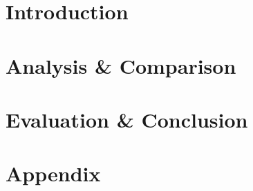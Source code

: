 \documentclass[openright,
               titlepage,
               numbers=noenddot,
               headinclude,
               footinclude=true,
               cleardoublepage=empty,
               abstractoff,
               BCOR=5mm,
               paper=a4,
               fontsize=11pt,
              ]{scrreprt}
\begin{document}
  \frenchspacing
  \raggedbottom


  \pagestyle{plain}

  

  

  \cleardoublepage
  

  \cleardoublepage
  

  \pagestyle{scrheadings}

  \cleardoublepage
  


  \cleardoublepage
  \part{Introduction}

  \cleardoublepage
  
  \cleardoublepage
  

  \cleardoublepage
  \part{Analysis \& Comparison}

  \cleardoublepage
  
  \cleardoublepage
  

  \cleardoublepage
  \part{Evaluation \& Conclusion}

  \cleardoublepage
  
  \cleardoublepage
  

  \appendix
  \cleardoublepage
  \part{Appendix}

  \cleardoublepage
  
\end{document}
